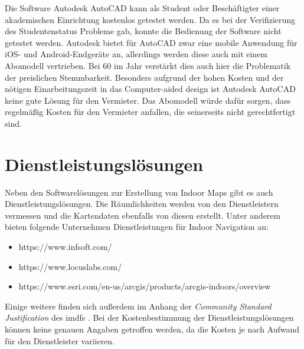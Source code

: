 {}{
Die Software Autodesk AutoCAD kann als Student oder Beschäftigter einer akademischen Einrichtung kostenlos getestet werden.
Da es bei der Verifizierung des Studentenstatus Probleme gab, konnte die Bedienung der Software nicht getestet werden.
}{
Autodesk bietet für AutoCAD zwar eine mobile Anwendung für iOS- und Android-Endgeräte an, allerdings werden diese auch mit einem Abomodell vertrieben.
Bei \SI{60}{\eur} im Jahr \parencite{AUT2020} verstärkt dies auch hier die Problematik der preislichen Stemmbarkeit.
}{
Besonders aufgrund der hohen Kosten und der nötigen Einarbeitungszeit in das Computer-aided design ist Autodesk AutoCAD keine gute Lösung für den Vermieter.
Das Abomodell würde dafür sorgen, dass regelmäßig Kosten für den Vermieter anfallen, die seinerseits nicht gerechtfertigt sind.
}

\section{Dienstleistungslösungen}
Neben den Softwarelösungen zur Erstellung von Indoor Maps gibt es auch Dienstleistungslösungen.
Die Räumlichkeiten werden von den Dienstleistern vermessen und die Kartendaten ebenfalls von diesen erstellt.
Unter anderem bieten folgende Unternehmen Dienstleistungen für Indoor Navigation an:
\begin{itemize}
	\item https://www.infsoft.com/
	\item https://www.locuslabs.com/
	\item https://www.esri.com/en-us/arcgis/products/arcgis-indoors/overview
\end{itemize}
Einige weitere finden sich außerdem im Anhang der \emph{Community Standard Justification} des \acl{imdf}s \parencite{HOA2019}.
Bei der Kostenbestimmung der Dienstleistungslösungen können keine genauen Angaben getroffen werden, da die Kosten je nach Aufwand für den Dienstleister variieren.

